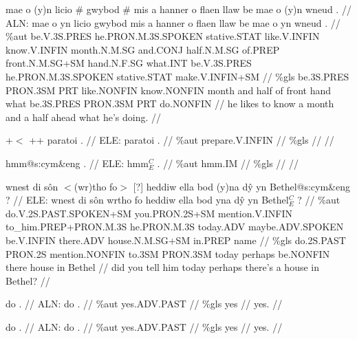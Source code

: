 \documentclass[a4paper,10pt]{article}
\begin{document}
\ex
\begingl[lingstyle=gergl]
\glchat mae o (y)n licio \# gwybod \# mis a hanner o flaen llaw be mae o (y)n wneud . //
\glsurface ALN:  mae o yn licio gwybod mis a hanner o flaen llaw be mae o yn wneud .  //
\glauto \%aut  be{\scriptsize .V.3S.PRES} he{\scriptsize .PRON.M.3S.SPOKEN} stative{\scriptsize .STAT} like{\scriptsize .V.INFIN} know{\scriptsize .V.INFIN} month{\scriptsize .N.M.SG} and{\scriptsize .CONJ} half{\scriptsize .N.M.SG} of{\scriptsize .PREP} front{\scriptsize .N.M.SG+SM} hand{\scriptsize .N.F.SG} what{\scriptsize .INT} be{\scriptsize .V.3S.PRES} he{\scriptsize .PRON.M.3S.SPOKEN} stative{\scriptsize .STAT} make{\scriptsize .V.INFIN+SM}   //
\glmanual \%gls  be{\scriptsize .3S.PRES} PRON{\scriptsize .3SM} PRT like{\scriptsize .NONFIN} know{\scriptsize .NONFIN} month and half of front hand what be{\scriptsize .3S.PRES} PRON{\scriptsize .3SM} PRT do{\scriptsize .NONFIN}   //
\gleng he likes to know a month and a half ahead what he's doing. //
\endgl
\xe

\ex
\begingl[lingstyle=gergl]
\glchat +$<$ ++ paratoi . //
\glsurface ELE:  paratoi .  //
\glauto \%aut  prepare{\scriptsize .V.INFIN}   //
\glmanual \%gls     //
\gleng  //
\endgl
\xe

\ex
\begingl[lingstyle=gergl]
\glchat hmm@s:cym\&eng . //
\glsurface ELE:  hmm$^{C}_{E}$ .  //
\glauto \%aut  hmm{\scriptsize .IM}   //
\glmanual \%gls     //
\gleng  //
\endgl
\xe

\ex
\begingl[lingstyle=gergl]
\glchat wnest di sôn $<$(wr)tho fo$>$ [?] heddiw ella bod (y)na dŷ yn Bethel@s:cym\&eng ? //
\glsurface ELE:  wnest di sôn wrtho fo heddiw ella bod yna dŷ yn Bethel$^{C}_{E}$ ?  //
\glauto \%aut  do{\scriptsize .V.2S.PAST.SPOKEN+SM} you{\scriptsize .PRON.2S+SM} mention{\scriptsize .V.INFIN} to\_him{\scriptsize .PREP+PRON.M.3S} he{\scriptsize .PRON.M.3S} today{\scriptsize .ADV} maybe{\scriptsize .ADV.SPOKEN} be{\scriptsize .V.INFIN} there{\scriptsize .ADV} house{\scriptsize .N.M.SG+SM} in{\scriptsize .PREP} name   //
\glmanual \%gls  do{\scriptsize .2S.PAST} PRON{\scriptsize .2S} mention{\scriptsize .NONFIN} to{\scriptsize .3SM} PRON{\scriptsize .3SM} today perhaps be{\scriptsize .NONFIN} there house in Bethel   //
\gleng did you tell him today perhaps there's a house in Bethel? //
\endgl
\xe

\ex
\begingl[lingstyle=gergl]
\glchat do . //
\glsurface ALN:  do .  //
\glauto \%aut  yes{\scriptsize .ADV.PAST}   //
\glmanual \%gls  yes   //
\gleng yes. //
\endgl
\xe

\ex
\begingl[lingstyle=gergl]
\glchat do . //
\glsurface ALN:  do .  //
\glauto \%aut  yes{\scriptsize .ADV.PAST}   //
\glmanual \%gls  yes   //
\gleng yes. //
\endgl
\xe
\end{document}
